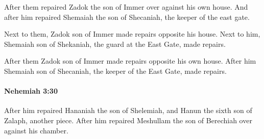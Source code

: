 			\begin{versebox}
					\item[BHS] 
					\item[LXX] 
					\item[ASV] After them repaired Zadok the son of Immer over against his own house. And after him repaired Shemaiah the son of Shecaniah, the keeper of the east gate.
					\item[NIV] Next to them, Zadok son of Immer made repairs opposite his house. Next to him, Shemaiah son of Shekaniah, the guard at the East Gate, made repairs.
					\item[NRSV] After them Zadok son of Immer made repairs opposite his own house. After him Shemaiah son of Shecaniah, the keeper of the East Gate, made repairs.
			\end{versebox}

		\paragraph{Nehemiah 3:30} %
			\label{NEHEMIAH-3-30}

			After him repaired Hananiah the son of Shelemiah, and Hanun the sixth son of Zalaph, another piece. After him repaired Meshullam the son of Berechiah over against his chamber.

